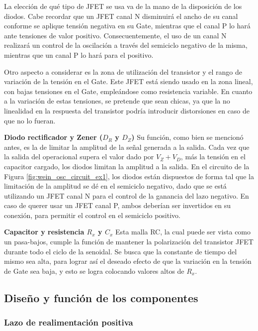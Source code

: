 La elección de qué tipo de JFET se usa va de la mano de la disposición de los diodos.
Cabe recordar que un JFET canal N disminuirá el ancho de su canal conforme se aplique tensión negativa en su Gate, mientras que el canal P lo hará ante 
tensiones de valor positivo.
Consecuentemente, el uso de un canal N realizará un control de la oscilación a través del semiciclo negativo de la misma, mientras que un canal P lo hará 
para el positivo.

Otro aspecto a considerar es la zona de utilización del transistor y el rango de variación de la tensión en el Gate.
Este JFET está siendo usado en la zona lineal, con bajas tensiones en el Gate, empleándose como resistencia variable.
En cuanto a la variación de estas tensiones, se pretende que sean chicas, ya que la no linealidad en la respuesta del transistor podría introducir 
distorsiones en caso de que no lo fueran.

\textbf{Diodo rectificador y Zener ($D_R$ y $D_Z$)}
Su función, como bien se mencionó antes, es la de limitar la amplitud de la señal generada a la salida.
Cada vez que la salida del operacional supera el valor dado por $V_Z + V_D$, más la tensión en el capacitor cargado, los diodos limitan la amplitud a la 
salida.
En el circuito de la Figura \ref{fig:wein_osc_circuit_ex1}, los diodos están dispuestos de forma tal que la limitación de la amplitud se dé en el 
semiciclo negativo, dado que se está utilizando un JFET canal N para el control de la ganancia del lazo negativo.
En caso de querer usar un JFET canal P, ambos deberían ser invertidos en su conexión, para permitir el control en el semiciclo positivo.

\textbf{Capacitor y resistencia $R_x$ y $C_x$}
Esta malla RC, la cual puede ser vista como un pasa-bajos, cumple la función de mantener la polarización del transistor JFET durante todo el ciclo de la 
senoidal.
Se busca que la constante de tiempo del mismo sea alta, para lograr así el deseado efecto de que la variación en la tensión de Gate sea baja, y esto se 
logra colocando valores altos de $R_x$.



\subsection{Diseño y función de los componentes}
\subsubsection{Lazo de realimentación positiva}



